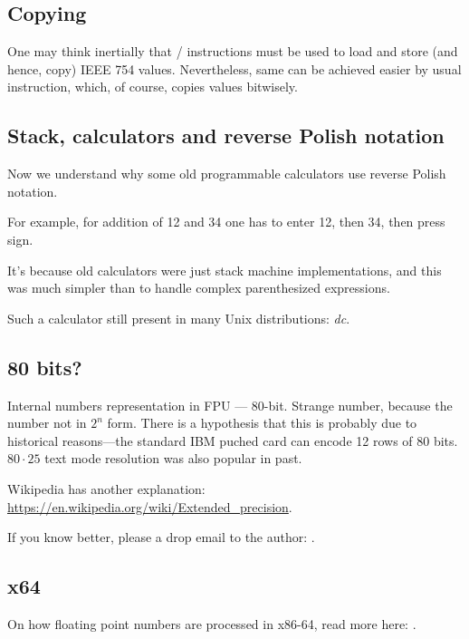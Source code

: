 \subsection{Copying}

One may think inertially that / instructions must be used to load and store (and hence, copy) IEEE 754 values.
Nevertheless, same can be achieved easier by usual  instruction, which, of course, copies values bitwisely.

\subsection{Stack, calculators and reverse Polish notation}


Now we understand why some old programmable calculators use reverse Polish notation.

For example, for addition of 12 and 34 one has to enter 12, then 34, then press  sign.

It's because old calculators were just stack machine implementations, and this was much simpler
than to handle complex parenthesized expressions.

Such a calculator still present in many Unix distributions: \emph{dc}.

\subsection{80 bits?}

Internal numbers representation in FPU --- 80-bit.
Strange number, because the number not in $2^n$ form.
There is a hypothesis that this is probably due to historical reasons---the standard IBM puched card can encode 12 rows of 80 bits.
$80\cdot 25$ text mode resolution was also popular in past.

Wikipedia has another explanation: \url{https://en.wikipedia.org/wiki/Extended_precision}.

If you know better, please a drop email to the author: \EMAIL{}.

\subsection{x64}

On how floating point numbers are processed in x86-64, read more here: .



